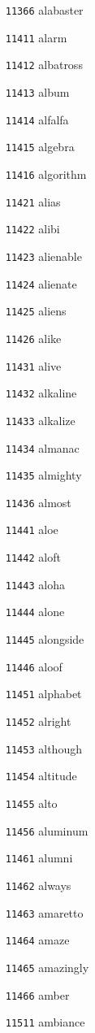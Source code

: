 \documentclass[twoside,11pt]{article}
\begin{document}
\begin{multicols}{5}
\begin{enumerate}
\item[\texttt{11366}] alabaster
\item[\texttt{11411}] alarm
\item[\texttt{11412}] albatross
\item[\texttt{11413}] album
\item[\texttt{11414}] alfalfa
\item[\texttt{11415}] algebra
\item[\texttt{11416}] algorithm
\item[\texttt{11421}] alias
\item[\texttt{11422}] alibi
\item[\texttt{11423}] alienable
\item[\texttt{11424}] alienate
\item[\texttt{11425}] aliens
\item[\texttt{11426}] alike
\item[\texttt{11431}] alive
\item[\texttt{11432}] alkaline
\item[\texttt{11433}] alkalize
\item[\texttt{11434}] almanac
\item[\texttt{11435}] almighty
\item[\texttt{11436}] almost
\item[\texttt{11441}] aloe
\item[\texttt{11442}] aloft
\item[\texttt{11443}] aloha
\item[\texttt{11444}] alone
\item[\texttt{11445}] alongside
\item[\texttt{11446}] aloof
\item[\texttt{11451}] alphabet
\item[\texttt{11452}] alright
\item[\texttt{11453}] although
\item[\texttt{11454}] altitude
\item[\texttt{11455}] alto
\item[\texttt{11456}] aluminum
\item[\texttt{11461}] alumni
\item[\texttt{11462}] always
\item[\texttt{11463}] amaretto
\item[\texttt{11464}] amaze
\item[\texttt{11465}] amazingly
\item[\texttt{11466}] amber
\item[\texttt{11511}] ambiance

\end{enumerate}
\end{multicols}
\end{document}
